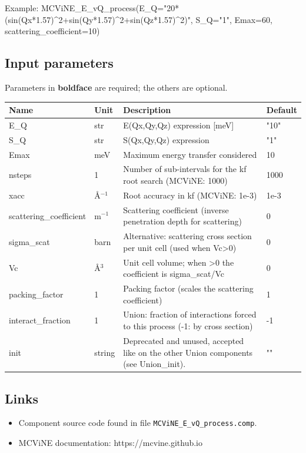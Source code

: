Example: MCViNE\_E\_vQ\_process(E\_Q="20*(sin(Qx*1.57)\textasciicircum{}2+sin(Qy*1.57)\textasciicircum{}2+sin(Qz*1.57)\textasciicircum{}2)", S\_Q="1", Emax=60, scattering\_coefficient=10)

\subsection*{Input parameters}
Parameters in \textbf{boldface} are required; the others are optional.

\begin{longtable}{p{}p{}p{}p{}}
\toprule
\textbf{Name} & \textbf{Unit} & \textbf{Description} & \textbf{Default} \\
\midrule
\endhead
E\_Q & str & E(Qx,Qy,Qz) expression [meV] & "10" \\
S\_Q & str & S(Qx,Qy,Qz) expression & "1" \\
Emax & meV & Maximum energy transfer considered & 10 \\
nsteps & 1 & Number of sub-intervals for the kf root search (MCViNE: 1000) & 1000 \\
xacc & \AA{}$^{-1}$ & Root accuracy in kf (MCViNE: 1e-3) & 1e-3 \\
scattering\_coefficient & m$^{-1}$ & Scattering coefficient (inverse penetration depth for scattering) & 0 \\
sigma\_scat & barn & Alternative: scattering cross section per unit cell (used when Vc\textgreater{}0) & 0 \\
Vc & \AA{}$^{3}$ & Unit cell volume; when \textgreater{}0 the coefficient is sigma\_scat/Vc & 0 \\
packing\_factor & 1 & Packing factor (scales the scattering coefficient) & 1 \\
interact\_fraction & 1 & Union: fraction of interactions forced to this process (-1: by cross section) & -1 \\
init & string & Deprecated and unused, accepted like on the other Union components (see Union\_init). & "" \\
\bottomrule
\end{longtable}

\subsection*{Links}
\begin{itemize}
  \item Component source code found in file \texttt{MCViNE\_E\_vQ\_process.comp}.
  \item MCViNE documentation: https://mcvine.github.io
\end{itemize}
